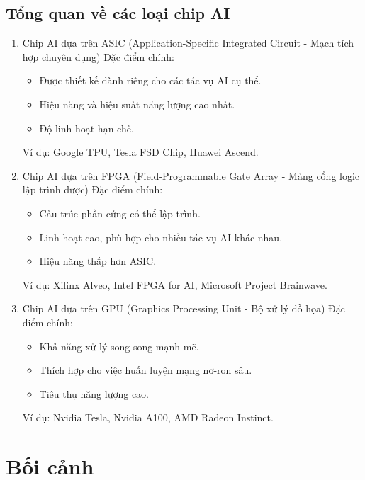\documentclass[a4paper]{article}
\begin{document}
\subsection{Tổng quan về các loại chip AI}
\begin{enumerate}
    \item Chip AI dựa trên ASIC (Application-Specific Integrated Circuit - Mạch tích hợp chuyên dụng)
    Đặc điểm chính:
    \begin{itemize}
        \item Được thiết kế dành riêng cho các tác vụ AI cụ thể.
        \item Hiệu năng và hiệu suất năng lượng cao nhất.
        \item Độ linh hoạt hạn chế.
    \end{itemize}
    Ví dụ: Google TPU, Tesla FSD Chip, Huawei Ascend.
    \item Chip AI dựa trên FPGA (Field-Programmable Gate Array - Mảng cổng logic lập trình được)
    Đặc điểm chính:
    \begin{itemize}
        \item Cấu trúc phần cứng có thể lập trình.
        \item Linh hoạt cao, phù hợp cho nhiều tác vụ AI khác nhau.
        \item Hiệu năng thấp hơn ASIC.
    \end{itemize}
    Ví dụ: Xilinx Alveo, Intel FPGA for AI, Microsoft Project Brainwave.
    \item Chip AI dựa trên GPU (Graphics Processing Unit - Bộ xử lý đồ họa)
    Đặc điểm chính:
    \begin{itemize}
        \item Khả năng xử lý song song mạnh mẽ.
        \item Thích hợp cho việc huấn luyện mạng nơ-ron sâu.
        \item Tiêu thụ năng lượng cao.
    \end{itemize}
    Ví dụ: Nvidia Tesla, Nvidia A100, AMD Radeon Instinct.
\end{enumerate}

\section{Bối cảnh}
\end{document}
